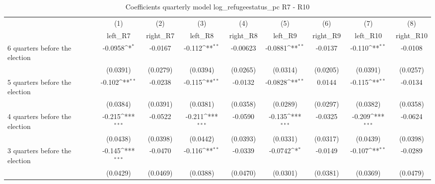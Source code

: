 \begin{table}[htbp]\centering
\def\sym#1{\ifmmode^{#1}\else\(^{#1}\)\fi}
\caption{Coefficients quarterly model log\_refugeestatus\_pc R7 - R10}
\begin{tabular}{l*{8}{c}}
\hline\hline
                    &\multicolumn{1}{c}{(1)}&\multicolumn{1}{c}{(2)}&\multicolumn{1}{c}{(3)}&\multicolumn{1}{c}{(4)}&\multicolumn{1}{c}{(5)}&\multicolumn{1}{c}{(6)}&\multicolumn{1}{c}{(7)}&\multicolumn{1}{c}{(8)}\\
                    &\multicolumn{1}{c}{left\_R7}&\multicolumn{1}{c}{right\_R7}&\multicolumn{1}{c}{left\_R8}&\multicolumn{1}{c}{right\_R8}&\multicolumn{1}{c}{left\_R9}&\multicolumn{1}{c}{right\_R9}&\multicolumn{1}{c}{left\_R10}&\multicolumn{1}{c}{right\_R10}\\
\hline
 6 quarters before the election&     -0.0958\sym{*}  &     -0.0167         &      -0.112\sym{**} &    -0.00623         &     -0.0881\sym{**} &     -0.0137         &      -0.110\sym{**} &     -0.0108         \\
                    &    (0.0391)         &    (0.0279)         &    (0.0394)         &    (0.0265)         &    (0.0314)         &    (0.0205)         &    (0.0391)         &    (0.0257)         \\
[1em]
 5 quarters before the election&      -0.102\sym{**} &     -0.0238         &      -0.115\sym{**} &     -0.0132         &     -0.0828\sym{**} &      0.0144         &      -0.115\sym{**} &     -0.0134         \\
                    &    (0.0384)         &    (0.0391)         &    (0.0381)         &    (0.0358)         &    (0.0289)         &    (0.0297)         &    (0.0382)         &    (0.0358)         \\
[1em]
 4 quarters before the election&      -0.215\sym{***}&     -0.0522         &      -0.211\sym{***}&     -0.0590         &      -0.135\sym{***}&     -0.0325         &      -0.209\sym{***}&     -0.0624         \\
                    &    (0.0438)         &    (0.0398)         &    (0.0442)         &    (0.0393)         &    (0.0331)         &    (0.0317)         &    (0.0439)         &    (0.0398)         \\
[1em]
 3 quarters before the election&      -0.145\sym{***}&     -0.0470         &      -0.116\sym{**} &     -0.0339         &     -0.0742\sym{*}  &     -0.0149         &      -0.107\sym{**} &     -0.0289         \\
                    &    (0.0429)         &    (0.0469)         &    (0.0388)         &    (0.0470)         &    (0.0301)         &    (0.0381)         &    (0.0369)         &    (0.0479)         \\

\end{tabular}
\end{table}
